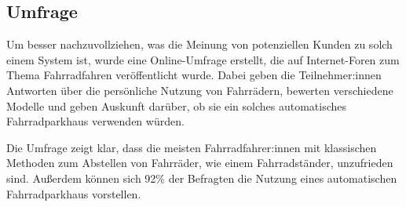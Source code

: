 \subsection{Umfrage}
Um besser nachzuvollziehen, was die Meinung von potenziellen Kunden zu solch einem System ist, wurde eine Online-Umfrage erstellt, die auf Internet-Foren zum Thema Fahrradfahren veröffentlicht wurde. Dabei geben die Teilnehmer:innen Antworten über die persönliche Nutzung von Fahrrädern, bewerten verschiedene Modelle und geben Auskunft darüber, ob sie ein solches automatisches Fahrradparkhaus verwenden würden.

\noindent Die Umfrage zeigt klar, dass die meisten Fahrradfahrer:innen mit klassischen Methoden zum Abstellen von Fahrräder, wie einem Fahrradständer, unzufrieden sind. Außerdem können sich 92\% der Befragten die Nutzung eines automatischen Fahrradparkhaus vorstellen.
